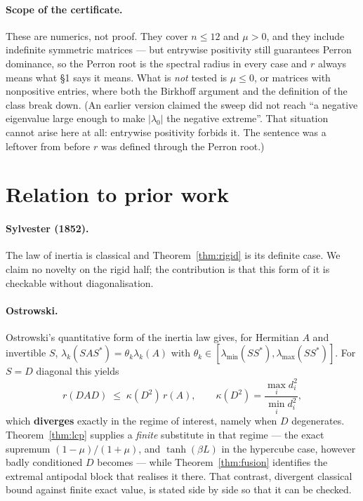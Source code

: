 \documentclass[11pt,a4paper]{article}
\theoremstyle{plain}
\theoremstyle{definition}
\begin{document}
\paragraph{Scope of the certificate.} These are numerics, not proof. They cover
$n\le 12$ and $\mu>0$, and they include indefinite symmetric matrices --- but
entrywise positivity still guarantees Perron dominance, so the Perron root is
the spectral radius in every case and $r$ always means what \S1 says it means.
What is \emph{not} tested is $\mu\le0$, or matrices with nonpositive entries,
where both the Birkhoff argument and the definition of the class break down.
(An earlier version claimed the sweep did not reach ``a negative eigenvalue
large enough to make $|\lambda_0|$ the negative extreme''. That situation cannot
arise here at all: entrywise positivity forbids it. The sentence was a leftover
from before $r$ was defined through the Perron root.)

\section{Relation to prior work}

\paragraph{Sylvester (1852).} The law of inertia is classical and
Theorem~\ref{thm:rigid} is its definite case. We claim no novelty on the rigid
half; the contribution is that this form of it is checkable without
diagonalisation.

\paragraph{Ostrowski.} Ostrowski's quantitative form of the inertia law gives,
for Hermitian $A$ and invertible $S$, $\lambda_k(SAS^{*})=\theta_k\lambda_k(A)$
with $\theta_k\in[\lambda_{\min}(SS^{*}),\lambda_{\max}(SS^{*})]$. For $S=D$
diagonal this yields
\[
  r(DAD) \;\le\; \kappa(D^2)\, r(A),
  \qquad \kappa(D^2)=\frac{\max_i d_i^2}{\min_i d_i^2},
\]
which \textbf{diverges} exactly in the regime of interest, namely when $D$
degenerates. Theorem~\ref{thm:lcp} supplies a \emph{finite} substitute in that
regime --- the exact supremum $(1-\mu)/(1+\mu)$, and $\tanh(\beta L)$ in the
hypercube case, however badly conditioned $D$ becomes --- while
Theorem~\ref{thm:fusion} identifies the extremal antipodal block that realises
it there. That contrast, divergent classical bound against finite exact value,
is stated side by side so that it can be checked.
\end{document}
